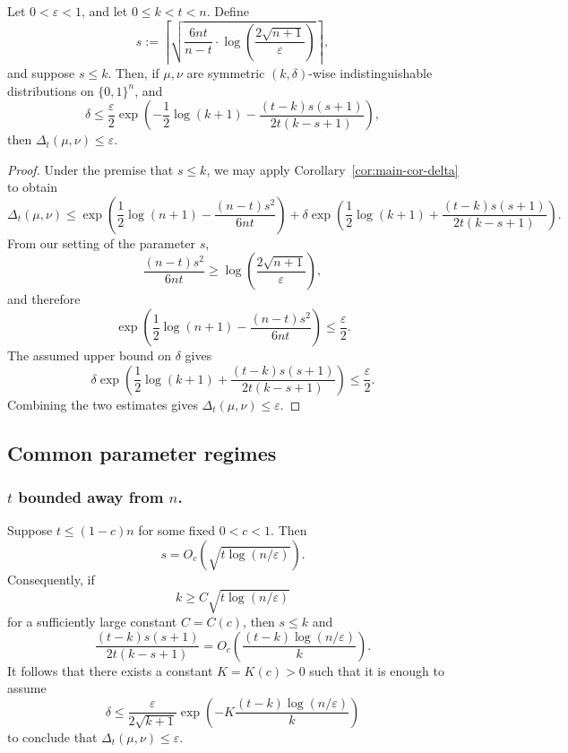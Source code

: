 \documentclass[manuscript,nonacm]{acmart}
\begin{document}
\begin{corollary}
\label{cor:finite-epsilon-criterion}
Let \(0<\varepsilon<1\), and let \(0\le k<t<n\). Define
\[
    s
    :=
    \left\lceil
        \sqrt{
            \frac{6nt}{n-t}\cdot
            \log\left(\frac{2\sqrt{n+1}}{\varepsilon}\right)
        }
    \right\rceil,
\]
and suppose $s\leq k$. Then, if \(\mu,\nu\) are symmetric \((k,\delta)\)-wise indistinguishable
distributions on \(\{0,1\}^n\), and
\[
    \delta
    \le
    \frac{\varepsilon}{2}
    \exp\!\left(
        -\frac12\log(k+1)
        -
        \frac{(t-k)s(s+1)}
             {2t(k-s+1)}
    \right),
\]
then $\Delta_t(\mu,\nu)\le \varepsilon$.
\end{corollary}

\begin{proof}
Under the premise that $s\leq k$, we may apply Corollary~\ref{cor:main-cor-delta} to obtain
\[
    \Delta_t(\mu,\nu)
    \le
    \exp\!\left(
        \frac12\log(n+1)
        -
        \frac{(n-t)s^2}{6nt}
    \right)
    +
    \delta
    \exp\!\left(
        \frac12\log(k+1)
        +
        \frac{(t-k)s(s+1)}
             {2t(k-s+1)}
    \right).
\]
From our setting of the parameter $s$,
\[
    \frac{(n-t)s^2}{6nt}
    \ge
    \log\left(\frac{2\sqrt{n+1}}{\varepsilon}\right),
\]
and therefore
\[
    \exp\!\left(
        \frac12\log(n+1)
        -
        \frac{(n-t)s^2}{6nt}
    \right)
    \le
    \frac{\varepsilon}{2}.
\]
The assumed upper bound on \(\delta\) gives
\[
    \delta
    \exp\!\left(
        \frac12\log(k+1)
        +
        \frac{(t-k)s(s+1)}
             {2t(k-s+1)}
    \right)
    \le
    \frac{\varepsilon}{2}.
\]
Combining the two estimates gives $\Delta_t(\mu,\nu)\le \varepsilon$.
\end{proof}

\subsection{Common parameter regimes}
\subsubsection{$t$ bounded away from $n$.}
Suppose \(t\le (1-c)n\) for some fixed \(0<c<1\). Then
\[
    s=O_c\!\left(\sqrt{t\log(n/\varepsilon)}\right).
\]
Consequently, if
\[
    k\ge C\sqrt{t\log(n/\varepsilon)}
\]
for a sufficiently large constant \(C=C(c)\), then \(s\le k\) and
\[
    \frac{(t-k)s(s+1)}
         {2t(k-s+1)}
    =
    O_c\!\left(
        \frac{(t-k)\log(n/\varepsilon)}{k}
    \right).
\]
It follows that there exists a constant \(K=K(c)>0\) such that it is
enough to assume
\[
    \delta
    \le
    \frac{\varepsilon}{2\sqrt{k+1}}
    \exp\!\left(
        -K
        \frac{(t-k)\log(n/\varepsilon)}{k}
    \right)
\]
to conclude that \(\Delta_t(\mu,\nu)\le\varepsilon\).
\end{document}
